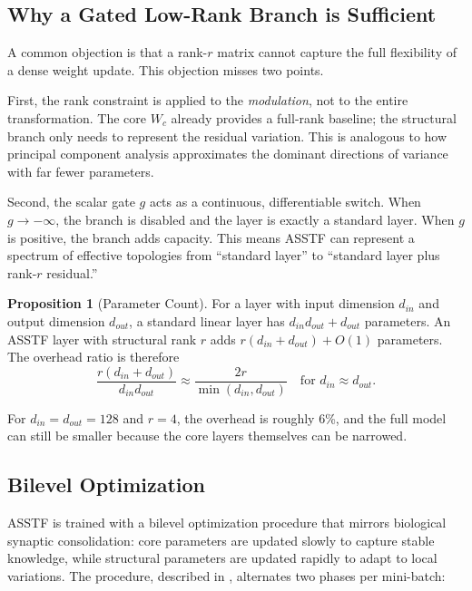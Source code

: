 \documentclass[11pt,a4paper]{article}
\theoremstyle{definition}
\newtheorem{proposition}{Proposition}[section]
\begin{document}
\subsection{Why a Gated Low-Rank Branch is Sufficient}
\label{subsec:why_sufficient}

A common objection is that a rank-$r$ matrix cannot capture the full flexibility of a dense weight update. This objection misses two points.

First, the rank constraint is applied to the \textit{modulation}, not to the entire transformation. The core $W_c$ already provides a full-rank baseline; the structural branch only needs to represent the residual variation. This is analogous to how principal component analysis approximates the dominant directions of variance with far fewer parameters.

Second, the scalar gate $g$ acts as a continuous, differentiable switch. When $g \to -\infty$, the branch is disabled and the layer is exactly a standard layer. When $g$ is positive, the branch adds capacity. This means ASSTF can represent a spectrum of effective topologies from ``standard layer'' to ``standard layer plus rank-$r$ residual.''

\begin{proposition}[Parameter Count]
    \label{prop:params}
    For a layer with input dimension $d_{in}$ and output dimension $d_{out}$, a standard linear layer has $d_{in} d_{out} + d_{out}$ parameters. An ASSTF layer with structural rank $r$ adds $r(d_{in} + d_{out}) + O(1)$ parameters. The overhead ratio is therefore
    \begin{equation}
        \frac{r(d_{in} + d_{out})}{d_{in} d_{out}} \approx \frac{2r}{\min(d_{in}, d_{out})}
        \quad \text{for } d_{in} \approx d_{out}.
    \end{equation}
\end{proposition}

For $d_{in}=d_{out}=128$ and $r=4$, the overhead is roughly 6\%, and the full model can still be smaller because the core layers themselves can be narrowed.

\subsection{Bilevel Optimization}
\label{subsec:bilevel}

ASSTF is trained with a bilevel optimization procedure that mirrors biological synaptic consolidation: core parameters are updated slowly to capture stable knowledge, while structural parameters are updated rapidly to adapt to local variations. The procedure, described in \cite{lin2025asstf}, alternates two phases per mini-batch:
\end{document}
